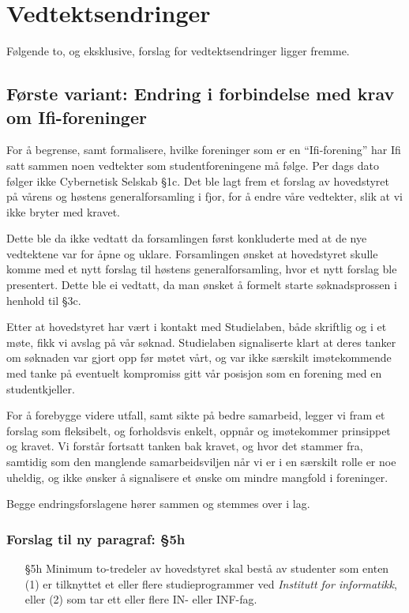 \documentclass[10pt,norsk,a4paper]{article}
\begin{document}
\newpage

\section{Vedtektsendringer}
Følgende to, og eksklusive, forslag for vedtektsendringer ligger fremme.

\subsection{Første variant: Endring i forbindelse med krav om Ifi-foreninger}\label{sec:ifi-forslag}

For å begrense, samt formalisere, hvilke foreninger som er en ``Ifi-forening''
har Ifi satt sammen noen vedtekter som studentforeningene må følge.  Per dags
dato følger ikke Cybernetisk Selskab §1c\footnotemark. Det ble lagt frem et
forslag av hovedstyret på vårens og høstens generalforsamling i fjor, for å
endre våre vedtekter, slik at vi ikke bryter med kravet.



Dette ble da ikke vedtatt da forsamlingen først konkluderte med at de nye vedtektene var for åpne og uklare.
Forsamlingen ønsket at hovedstyret skulle komme med et nytt forslag til høstens generalforsamling, hvor et
nytt forslag ble presentert. Dette ble ei vedtatt, da man ønsket å formelt starte søknadsprossen i henhold
til §3c.

Etter at hovedstyret har vært i kontakt med Studielaben, både skriftlig og i et møte, fikk vi avslag på vår
søknad. Studielaben signaliserte klart at deres tanker om søknaden var gjort opp før møtet vårt, og
var ikke særskilt imøtekommende med tanke på eventuelt kompromiss gitt vår posisjon som en forening med
en studentkjeller.

For å forebygge videre utfall, samt sikte på bedre samarbeid, legger vi fram et forslag som fleksibelt, og
forholdsvis enkelt, oppnår og imøtekommer prinsippet og kravet. Vi forstår fortsatt tanken bak kravet, og
hvor det stammer fra, samtidig som den manglende samarbeidsviljen når vi er i en særskilt rolle er
noe uheldig, og ikke ønsker å signalisere et ønske om mindre mangfold i foreninger.

Begge endringsforslagene hører sammen og stemmes over i lag.

\subsubsection{Forslag til ny paragraf: §5h}
\begin{enumerate}
	\item[§5h] Minimum to-tredeler av hovedstyret skal bestå av studenter som enten (1) er tilknyttet et eller flere studieprogrammer ved \textit{Institutt for informatikk}, eller (2) som tar ett eller flere IN- eller INF-fag.
\end{enumerate}
\end{document}
